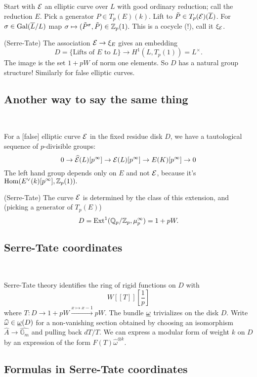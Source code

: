 \documentclass[12pt,amsfont]{amsart}
\begin{document}
Start with $\mathcal{E}$ an elliptic curve over $L$ with good ordinary reduction; call the reduction $E$. Pick a generator $P \in T_p(E)(k)$. Lift to $\tilde{P} \in T_p(\mathcal{E})(\overline{L})$. For $\sigma \in \operatorname{Gal}(\overline{L}/L)$ map $\sigma \mapsto (\tilde{P}^\sigma, \tilde{P}) \in {\mathbb Z}_p(1).$ This is a cocycle (!), call it $\xi_{\mathcal{E}}$. 

\begin{thm} (Serre-Tate) The association $\mathcal{E} \rightarrow \xi_E$ gives an embedding 
\[D = \{\text{Lifts of } E \text{ to } L\} \rightarrow H^1(L, T_p(1)) = L^\times.\]
The image is the set $1 + pW$ of norm one elements. So $D$ has a natural group structure! Similarly for false elliptic curves.
\end{thm}

\subsection{Another way to say the same thing}
{\ }

For a [false] elliptic curve $\mathcal{E}$ in the fixed residue disk $D$, we have a tautological sequence of $p$-divisible groups:
\[0 \rightarrow \widehat{\mathcal{E}}(L)[p^\infty] \rightarrow \mathcal{E}(L)[p^\infty] \rightarrow E(K)[p^\infty] \rightarrow 0 \]
The left hand group depends only on $E$ and not $\mathcal{E}$, because it's $\operatorname{Hom}(E^\vee(k)[p^\infty], {\mathbb Z}_p(1)).$

\begin{thm} (Serre-Tate) The curve $\mathcal{E}$ is determined by the class of this extension, and (picking a generator of $T_p(E)$)
\[D = \operatorname{Ext}^1({\mathbb Q}_p/{\mathbb Z}_p, \mu_p^\infty) = 1 + pW.\]
\end{thm}

\subsection{Serre-Tate coordinates}
{\ }

Serre-Tate theory identifies the ring of rigid functions on $D$ with
\[W[[T]] \left [\frac{1}{p} \right ]\]
where $T: D \rightarrow 1 + pW \overset{x \mapsto x-1}{\rightarrow} pW.$ The bundle $\underline{\omega}$ trivializes on the disk $D$. Write $\widehat{\omega} \in \underline{\omega}(D)$ for a non-vanishing section obtained by choosing an isomorphism $\widehat{A} \rightarrow \widehat{\mathbb{G}_m}$ and pulling back $dT/T$. We can express a modular form of weight $k$ on $D$ by an expression of the form $F(T)\widehat{\omega}^{\otimes k}$. 

\subsection{Formulas in Serre-Tate coordinates}
{\ }
\end{document}
